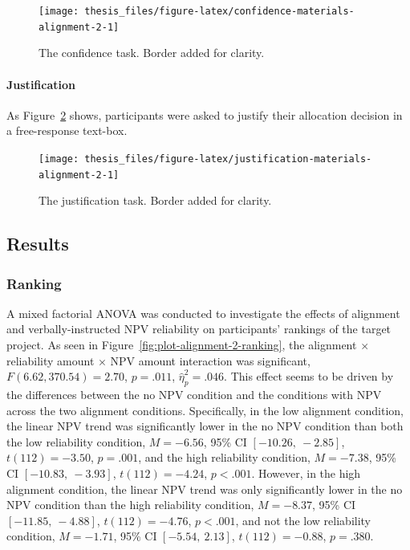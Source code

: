 \documentclass[a4paper, nobind, dvipsnames]{templates/ociamthesis}
\theoremstyle{definition}
\theoremstyle{definition}
\theoremstyle{definition}
\theoremstyle{definition}
\theoremstyle{remark}
\begin{document}
\begin{figure}
\texttt{[image: thesis\_files/figure-latex/confidence-materials-alignment-2-1]} \caption{The confidence task. Border added for clarity.}\label{fig:confidence-materials-alignment-2}
\end{figure}

\hypertarget{justification-materials-alignment-2}{%
\paragraph{Justification}\label{justification-materials-alignment-2}}

As Figure~\ref{fig:justification-materials-alignment-2} shows, participants
were asked to justify their allocation decision in a free-response text-box.



\begin{figure}
\texttt{[image: thesis\_files/figure-latex/justification-materials-alignment-2-1]} \caption{The justification task. Border added for clarity.}\label{fig:justification-materials-alignment-2}
\end{figure}

\hypertarget{results-alignment-2-appendix}{%
\subsection{Results}\label{results-alignment-2-appendix}}

\subsubsection{Ranking}

A mixed factorial ANOVA was conducted to investigate the effects of alignment
and verbally-instructed NPV reliability on participants' rankings of the
target project. As seen in Figure~\ref{fig:plot-alignment-2-ranking}, the
alignment \(\times\) reliability amount \(\times\) NPV amount interaction was
significant,
\(F(6.62, 370.54) = 2.70\), \(p = .011\), \(\hat{\eta}^2_p = .046\). This
effect seems to be driven by the differences between the no NPV condition and
the conditions with NPV across the two alignment conditions. Specifically, in
the low alignment condition, the linear NPV trend was significantly lower in the
no NPV condition than both the low reliability condition,
\(M = -6.56\), 95\% CI \([-10.26,~-2.85]\), \(t(112) = -3.50\), \(p = .001\), and the high
reliability condition, \(M = -7.38\), 95\% CI \([-10.83,~-3.93]\), \(t(112) = -4.24\), \(p < .001\).
However, in the high alignment condition, the linear NPV trend was only
significantly lower in the no NPV condition than the high reliability condition,
\(M = -8.37\), 95\% CI \([-11.85,~-4.88]\), \(t(112) = -4.76\), \(p < .001\), and not the low
reliability condition, \(M = -1.71\), 95\% CI \([-5.54,~2.13]\), \(t(112) = -0.88\), \(p = .380\).
\end{document}
